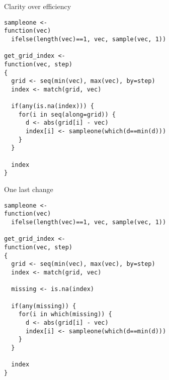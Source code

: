 \documentclass[12pt,t]{beamer}
\begin{document}
\begin{frame}[fragile,c]{Clarity over efficiency}

\begin{lstlisting}
sampleone <-
function(vec)
  ifelse(length(vec)==1, vec, sample(vec, 1))

get_grid_index <-
function(vec, step)
{
  grid <- seq(min(vec), max(vec), by=step)
  index <- match(grid, vec)

  if(any(is.na(index))) {
    for(i in seq(along=grid)) {
      d <- abs(grid[i] - vec)
      index[i] <- sampleone(which(d==min(d)))
    }
  }

  index
}
\end{lstlisting}


\end{frame}


\begin{frame}[fragile,c]{One last change}

\begin{lstlisting}
sampleone <-
function(vec)
  ifelse(length(vec)==1, vec, sample(vec, 1))

get_grid_index <-
function(vec, step)
{
  grid <- seq(min(vec), max(vec), by=step)
  index <- match(grid, vec)

  missing <- is.na(index)

  if(any(missing)) {
    for(i in which(missing)) {
      d <- abs(grid[i] - vec)
      index[i] <- sampleone(which(d==min(d)))
    }
  }

  index
}
\end{lstlisting}


\end{frame}
\end{document}
